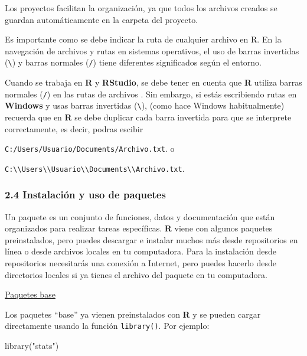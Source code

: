 \documentclass[
  letterpaper,
  DIV=11,
  numbers=noendperiod]{scrartcl}
\newenvironment{Shaded}{\begin{snugshade}}{\end{snugshade}}
\newcommand{\FunctionTok}[1]{\textcolor[rgb]{0.28,0.35,0.67}{#1}}
\newcommand{\NormalTok}[1]{\textcolor[rgb]{0.00,0.23,0.31}{#1}}
\newcommand{\StringTok}[1]{\textcolor[rgb]{0.13,0.47,0.30}{#1}}
\begin{document}
Los proyectos facilitan la organización, ya que todos los archivos
creados se guardan automáticamente en la carpeta del proyecto.

Es importante como se debe indicar la ruta de cualquier archivo en R. En
la navegación de archivos y rutas en sistemas operativos, el uso de
barras invertidas (\texttt{\textbackslash{}}) y barras normales
(\texttt{/}) tiene diferentes significados según el entorno.

Cuando se trabaja en \textbf{R} y \textbf{RStudio}, se debe tener en
cuenta que \textbf{R} utiliza barras normales (\texttt{/}) en las rutas
de archivos . Sin embargo, si estás escribiendo rutas en
\textbf{Windows} y usas barras invertidas (\texttt{\textbackslash{}}),
(como hace Windows habitualmente) recuerda que en \textbf{R} se debe
duplicar cada barra invertida para que se interprete correctamente, es
decir, podras escibir

\texttt{C:/Users/Usuario/Documents/Archivo.txt}. o

\texttt{C:\textbackslash{}\textbackslash{}Users\textbackslash{}\textbackslash{}Usuario\textbackslash{}\textbackslash{}Documents\textbackslash{}\textbackslash{}Archivo.txt}.

\hypertarget{instalaciuxf3n-y-uso-de-paquetes}{%
\subsubsection{2.4 Instalación y uso de
paquetes}\label{instalaciuxf3n-y-uso-de-paquetes}}

Un paquete es un conjunto de funciones, datos y documentación que están
organizados para realizar tareas específicas. \textbf{R} viene con
algunos paquetes preinstalados, pero puedes descargar e instalar muchos
más desde repositorios en línea o desde archivos locales en tu
computadora. Para la instalación desde repositorios necesitarás una
conexión a Internet, pero puedes hacerlo desde directorios locales si ya
tienes el archivo del paquete en tu computadora.

\uline{Paquetes base}

Los paquetes ``base'' ya vienen preinstalados con \textbf{R} y se pueden
cargar directamente usando la función \texttt{library()}. Por ejemplo:

\begin{Shaded}
\begin{Highlighting}[]
\FunctionTok{library}\NormalTok{(}\StringTok{"stats"}\NormalTok{)}
\end{Highlighting}
\end{Shaded}
\end{document}
